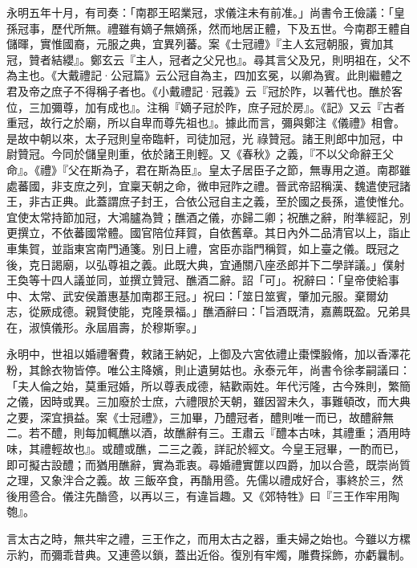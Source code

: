 \begin{pinyinscope}
 永明五年十月，有司奏：「南郡王昭業冠，求儀注未有前准。」尚書令王儉議：「皇孫冠事，歷代所無。禮雖有嫡子無嫡孫，然而地居正體，下及五世。今南郡王體自儲暉，實惟國裔，元服之典，宜異列蕃。案《士冠禮》『主人玄冠朝服，賓加其冠，贊者結纓』。鄭玄云『主人，冠者之父兄也』。尋其言父及兄，則明祖在，父不為主也。《大戴禮記·公冠篇》云公冠自為主，四加玄冕，以卿為賓。此則繼體之君及帝之庶子不得稱子者也。《小戴禮記·冠義》云『冠於阼，以著代也。醮於客位，三加彌尊，加有成也』。注稱『嫡子冠於阼，庶子冠於房』。《記》又云『古者重冠，故行之於廟，所以自卑而尊先祖也』。據此而言，彌與鄭注《儀禮》相會。是故中朝以來，太子冠則皇帝臨軒，司徒加冠，光
 祿贊冠。諸王則郎中加冠，中尉贊冠。今同於儲皇則重，依於諸王則輕。又《春秋》之義，『不以父命辭王父命』。《禮》『父在斯為子，君在斯為臣』。皇太子居臣子之節，無專用之道。南郡雖處蕃國，非支庶之列，宜稟天朝之命，微申冠阼之禮。晉武帝詔稱漢、魏遣使冠諸王，非古正典。此蓋謂庶子封王，合依公冠自主之義，至於國之長孫，遣使惟允。宜使太常持節加冠，大鴻臚為贊；醮酒之儀，亦歸二卿；祝醮之辭，附準經記，別更撰立，不依蕃國常體。國官陪位拜賀，自依舊章。其日內外二品清官以上，詣止車集賀，並詣東宮南門通箋。別日上禮，宮臣亦詣門稱賀，如上臺之儀。既冠之後，克日謁廟，以弘尊祖之義。此既大典，宜通關八座丞郎并下二學詳議。」僕射王奐等十四人議並同，並撰立贊冠、醮酒二辭。詔「可」。祝辭曰：「皇帝使給事中、太常、武安侯蕭惠基加南郡王冠。」祝曰：「筮日筮賓，肇加元服。棄爾幼
 志，從厥成德。親賢使能，克隆景福。」醮酒辭曰：「旨酒既清，嘉薦既盈。兄弟具在，淑慎儀形。永屆眉壽，於穆斯寧。」



 永明中，世祖以婚禮奢費，敕諸王納妃，上御及六宮依禮止棗慄腶脩，加以香澤花粉，其餘衣物皆停。唯公主降嬪，則止遺舅姑也。永泰元年，尚書令徐孝嗣議曰：「夫人倫之始，莫重冠婚，所以尊表成德，結歡兩姓。年代污隆，古今殊則，繁簡之儀，因時或異。三加廢於士庶，六禮限於天朝，雖因習未久，事難頓改，而大典之要，深宜損益。案《士冠禮》，三加畢，乃醴冠者，醴則唯一而已，故醴辭無二。若不醴，則每加輒醮以酒，故醮辭有三。王肅云『醴本古味，其禮重；酒用時味，其禮輕故也』。或醴或醮，二三之義，詳記於經文。今皇王冠畢，一酌而已，即可擬古設醴；而猶用醮辭，實為乖衷。尋婚禮實篚以四爵，加以合巹，既崇尚質之理，又象泮合之義。故
 三飯卒食，再酳用巹。先儒以禮成好合，事終於三，然後用巹合。儀注先酳巹，以再以三，有違旨趣。又《郊特牲》曰『三王作牢用陶匏』。



 言太古之時，無共牢之禮，三王作之，而用太古之器，重夫婦之始也。今雖以方樏示約，而彌乖昔典。又連巹以鎖，蓋出近俗。復別有牢燭，雕費採飾，亦虧曩制。




\end{pinyinscope}
